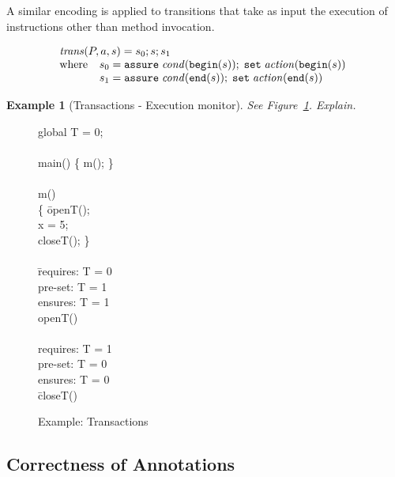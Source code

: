 \documentclass[10pt,notitlepage,twoside]{article}
\newcommand{\aut}{a}
\newtheorem{example}{Example}
\begin{document}
A similar encoding is applied to transitions that take as input the execution of instructions other than method invocation.

\begin{displaymath}
\begin{array}{l}
\mathit{trans}(P,\aut,s) = s_0; s; s_1 \\
\mbox{where}\;\;
\begin{array}[t]{l}
s_0 = \texttt{assure}\; \mathit{cond}(\texttt{begin}(s));\; \texttt{set}\;\mathit{action}(\texttt{begin}(s)) \\
s_1 = \texttt{assure}\; \mathit{cond}(\texttt{end}(s));\; \texttt{set}\;\mathit{action}(\texttt{end}(s))
\end{array}
\end{array}
\end{displaymath}


\begin{example}[Transactions - Execution monitor]\label{ex:transactions-em}
See Figure~\ref{fig:transactions-em}. Explain.
\end{example}

\begin{figure}[tbp]
\ttfamily
\begin{tabbing}
global T = 0; \\
\ \\
main() \{ m(); \} \\
\ \\
m() \\
\{ \=openT(); \\
\> x = 5; \\
\> closeT(); \} \\
\ \\
\= requires: T = 0  \\
pre-set: T = 1 \\
ensures: T = 1 \\
openT()  \\
\ \\
requires: T = 1  \\
pre-set: T = 0 \\
ensures: T = 0 \\
\=closeT() 
\end{tabbing}
\caption{Example: Transactions}\label{fig:transactions-em}
\end{figure}

\subsection{Correctness of Annotations}
\end{document}
